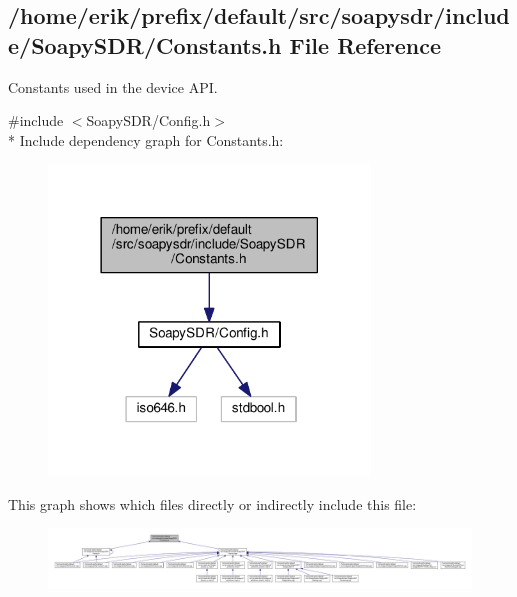 \subsection{/home/erik/prefix/default/src/soapysdr/include/\+Soapy\+S\+D\+R/\+Constants.h File Reference}
\label{Constants_8h}


Constants used in the device A\+PI.  


{\ttfamily \#include $<$Soapy\+S\+D\+R/\+Config.\+h$>$}\\*
Include dependency graph for Constants.\+h\+:
\nopagebreak
\begin{figure}[H]
\begin{center}
\leavevmode
\includegraphics[width=242pt]{d0/dfb/Constants_8h__incl}
\end{center}
\end{figure}
This graph shows which files directly or indirectly include this file\+:
\nopagebreak
\begin{figure}[H]
\begin{center}
\leavevmode
\includegraphics[width=350pt]{da/d9f/Constants_8h__dep__incl}
\end{center}
\end{figure}
